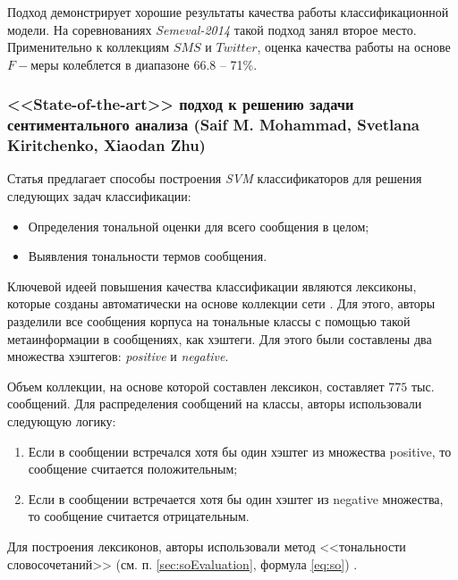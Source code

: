     Подход демонстрирует хорошие результаты качества работы классификационной
    модели. На соревнованиях {\it Semeval-2014} такой подход занял второе
    место.
    Применительно к коллекциям $SMS$ и $Twitter$, оценка качества работы на
    основе $F-$меры колеблется в диапазоне 66.8 -- 71\%.

    \subsubsection{<<State-of-the-art>> подход к решению задачи
        сентиментального анализа (Saif M. Mohammad, Svetlana Kiritchenko, Xiaodan Zhu)}

    Статья \cite{modernApproach} предлагает способы построения {\it SVM}
    классификаторов для решения следующих задач классификации:
    \begin{itemize}
        \item Определения тональной оценки для всего сообщения в целом;
        \item Выявления тональности термов сообщения.
    \end{itemize}

    Ключевой идеей повышения качества классификации являются лексиконы,
    которые созданы автоматически на основе коллекции сети \twitter.
    Для этого, авторы разделили все сообщения корпуса на тональные классы с
    помощью такой метаинформации в сообщениях, как хэштеги.
    Для этого были составлены два множества хэштегов: {\it positive} и
    {\it negative}.

    Объем коллекции, на основе которой составлен лексикон, составляет $775$
    тыс. сообщений. Для распределения сообщений на классы, авторы использовали
    следующую логику:
    \begin{enumerate}
        \item Если в сообщении встречался хотя бы один хэштег из множества positive, то
            сообщение считается положительным;
        \item Если в сообщении встречается хотя бы один хэштег из negative множества, то
            сообщение считается отрицательным.
    \end{enumerate}

    Для построения лексиконов, авторы использовали метод <<тональности словосочетаний>>
    (см. п. \ref{sec:soEvaluation}, формула \ref{eq:so}) \cite{lexiconSO}.

